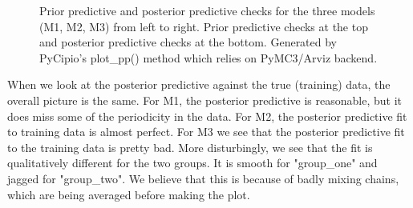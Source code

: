 \documentclass{article}
\begin{document}
\begin{figure}[H]
    \centering
    \quad
    \quad
    \caption{Prior predictive and posterior predictive checks for the three models (M1, M2, M3) from left to right. Prior predictive checks at the top and posterior predictive checks at the bottom. Generated by PyCipio's plot\_pp() method which relies on PyMC3/Arviz backend.}
\end{figure}

When we look at the posterior predictive against the true (training) data, the overall picture is the same. For M1, the posterior predictive is reasonable, but it does miss some of the periodicity in the data. 
For M2, the posterior predictive fit to training data is almost perfect.
For M3 we see that the posterior predictive fit to the training data is pretty bad. 
More disturbingly, we see that the fit is qualitatively different for the two groups. 
It is smooth for "group\_one" and jagged for "group\_two". We believe that this is because of badly mixing chains, 
which are being averaged before making the plot. 
\end{document}

